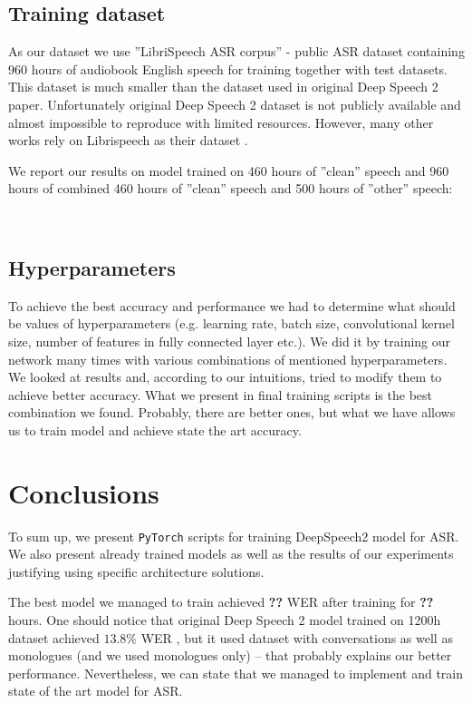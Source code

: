 \documentclass[licencjacka,en]{pracamgr}
\newcommand{\todoplot}[1]{
\ \\
\noindent%
\begin{minipage}{\linewidth}%
\makebox[\linewidth]{%
		\begin{tikzpicture}
		\begin{axis}[
            ymin = 0, ymax = 5,
            xmin = 0, xmax = 600,
            minor y tick num = 4,
            minor x tick num = 1,
            ymajorgrids = true,
            grid style = dashed,
            scaled x ticks = false,
            xlabel = TODO,
            ylabel = TODO,
            legend pos=outer north east,
            no markers
          ]
		  \addplot table[x=epochs,y=training]{\first};
		  \addlegendentry{TODO}

		\end{axis}
		\end{tikzpicture}
		}\captionof{figure}{#1}\label{diag:time}     
\end{minipage}
}
\begin{document}
\section{Training dataset}
As our dataset we use ''LibriSpeech ASR corpus'' \cite{DATA} - public ASR dataset containing 960 hours of audiobook English speech for training together with test datasets. This dataset is much smaller than the dataset used in original Deep Speech 2 paper. Unfortunately original Deep Speech 2 dataset is not publicly available and almost impossible to reproduce with limited resources. However, many other works rely on Librispeech as their dataset \cite{LIBRI-EX}.

We report our results on model trained on 460 hours of ''clean'' speech and 960 hours of combined 460 hours of ''clean'' speech and 500 hours of ''other'' speech:

\todoplot{TODO}

\section{Hyperparameters}
To achieve the best accuracy and performance we had to determine what should be values of hyperparameters (e.g. learning rate, batch size, convolutional kernel size, number of features in fully connected layer etc.). We did it by training our network many times with various combinations of mentioned hyperparameters. We looked at results and, according to our intuitions, tried to modify them to achieve better accuracy. What we present in final training scripts is the best combination we found. Probably, there are better ones, but what we have allows us to train model and achieve state the art accuracy.


\chapter{Conclusions}\label{r:concls}

To sum up, we present \texttt{PyTorch} scripts for training DeepSpeech2 model for ASR. We also present already trained models as well as the results of our experiments justifying using specific architecture solutions.

The best model we managed to train achieved \textbf{??} WER after training for \textbf{??} hours. One should notice that original Deep Speech 2 model trained on 1200h dataset achieved $13.8$\% WER \cite{DS2}, but it used dataset with conversations as well as monologues (and we used monologues only) -- that probably explains our better performance. Nevertheless, we can state that we managed to implement and train state of the art model for ASR.
\end{document}
